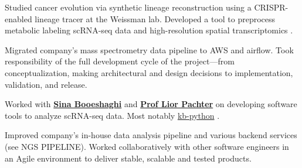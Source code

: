 \documentclass[]{resume}
\begin{document}
\begin{minipage}[t]{0.69\textwidth}
Studied cancer evolution via synthetic lineage reconstruction using a CRISPR-enabled lineage tracer at the Weissman lab. Developed a tool to preprocess metabolic labeling scRNA-seq data \cite{dynast} and high-resolution spatial transcriptomics \cite{spateo}.
\sectionsep

Migrated company's mass spectrometry data pipeline to AWS and airflow. Took responsibility of the full development cycle of the project---from conceptualization, making architectural and design decisions to implementation, validation, and release.
\sectionsep

Worked with \textbf{\href{https://sinabooeshaghi.com/}{Sina Booeshaghi}} and \textbf{\href{https://pachterlab.github.io/biography.html}{Prof Lior Pachter}} on developing software tools to analyze scRNA-seq data. Most notably \href{https://github.com/pachterlab/kb_python}{kb-python} \cite{kb}.
\sectionsep

Improved company's in-house data analysis pipeline and various backend services (see NGS PIPELINE). Worked collaboratively with other software engineers in an Agile environment to deliver stable, scalable and tested products.
\sectionsep





\end{minipage}
\end{document}

